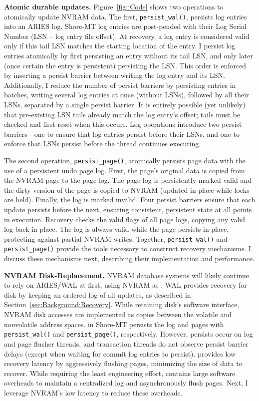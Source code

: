 
\textbf{Atomic durable updates.}
Figure~\ref{fig::Code} shows two operations to atomically update NVRAM data.
The first, \texttt{persist\_wal()}, persists log entries into an ARIES log.
Sho\-re-MT log entries are post-pended with their Log Serial Number (LSN -- log entry file offset).
At recovery, a log entry is considered valid only if this tail LSN matches the starting location of the entry.
I persist log entries atomically by first persisting an entry without its tail LSN, and only later (once certain the entry is persistent) persisting the LSN.
This order is enforced by inserting a persist barrier between writing the log entry and its LSN.
Additionally, I reduce the number of persist barriers by persisting entries in batches, writing several log entries at once (without LSNs), followed by all their LSNs, separated by a single persist barrier.
It is entirely possible (yet unlikely) that pre-existing LSN tails already match the log entry's offset; tails must be checked and first reset when this occurs.
Log operations introduce two persist barriers---one to ensure that log entries persist before their LSNs, and one to enforce that LSNs persist before the thread continues executing.

The second operation, \texttt{persist\_page()}, atomically persists page data with the use of a persistent undo page log.
First, the page's original data is copied from the NVRAM page to the page log.
The page log is persistently marked valid and the dirty version of the page is copied to NVRAM (updated in-place while locks are held).
Finally, the log is marked invalid.
Four persist barriers ensure that each update persists before the next, ensuring consistent, persistent state at all points in execution.
Recovery checks the valid flags of all page logs, copying any valid log back in-place.
The log is always valid while the page persists in-place, protecting against partial NVRAM writes.
Together, \texttt{persist\_wal()} and \texttt{persist\_page()} provide the tools necessary to construct recovery mechanisms.
I discuss these mechanisms next, describing their implementation and performance.

\textbf{NVRAM Disk-Replacement.}
NVRAM database systems will likely continue to rely on ARIES/WAL at first, using NVRAM as \NVDisk.
WAL provides recovery for disk by keeping an ordered log of all updates, as described in Section~\ref{sec:Background:Recovery}.
While retaining disk's software interface, NVRAM disk accesses are implemented as copies between the volatile and nonvolatile address spaces.
\NVDisk in Shore-MT persists the log and pages with \texttt{persist\_wal()} and \texttt{persist\_page()}, respectively.
However, persists occur on log and page flusher threads, and transaction threads do not observe persist barrier delays (except when waiting for commit log entries to persist).
\NVDisk provides low recovery latency by aggressively flushing pages, minimizing the size of data to recover.
While requiring the least engineering effort, \NVDisk contains large software overheads to maintain a centralized log and asynchronously flush pages.
Next, I leverage NVRAM's low latency to reduce these overheads.

